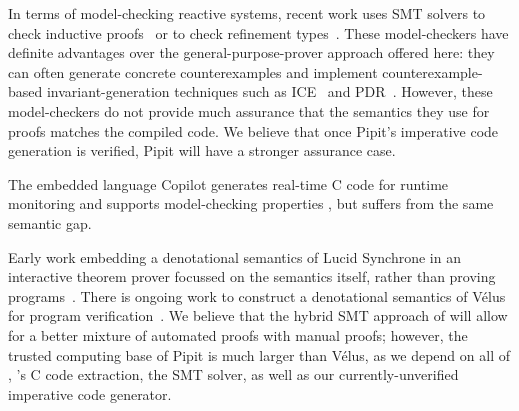 \documentclass[sigplan,screen, review]{acmart}
\begin{document}
In terms of model-checking reactive systems,
recent work uses SMT solvers to check inductive proofs~\cite{hagen2008scaling,champion2016kind2} or to check refinement types~\cite{chen2022synchronous}.
These model-checkers have definite advantages over the general-purpose-prover approach offered here: they can often generate concrete counterexamples and implement counterexample-based invariant-generation techniques such as ICE~\cite{garg2014ice} and PDR~\cite{bradley2011sat,een2011efficient}.
However, these model-checkers do not provide much assurance that the semantics they use for proofs matches the compiled code.
We believe that once Pipit's imperative code generation is verified, Pipit will have a stronger assurance case.

The embedded language Copilot generates real-time C code for runtime monitoring and supports model-checking properties \cite{laurent2015assuring}, but suffers from the same semantic gap.

Early work embedding a denotational semantics of Lucid Synchrone in an interactive theorem prover focussed on the semantics itself, rather than proving programs~\cite{boulme2001clocked}.
There is ongoing work to construct a denotational semantics of Vélus for program verification~\cite{bourke2022towards}.
We believe that the hybrid SMT approach of \fstar{} will allow for a better mixture of automated proofs with manual proofs;
however, the trusted computing base of Pipit is much larger than Vélus, as we depend on all of \fstar{}, \lowstar{}'s C code extraction, the SMT solver, as well as our currently-unverified imperative code generator.



\end{document}
